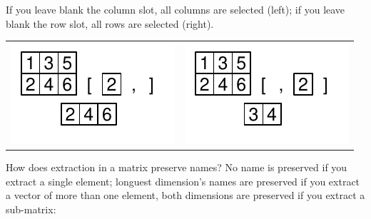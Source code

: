 \documentclass[pdflatex]{article}
\begin{document}
If you leave blank the column slot, all columns are selected (left); if you leave blank the row slot, all rows are selected (right).

\begin{tabular}{cc}
\includegraphics{matrix_extraction_rows} & \includegraphics{matrix_extraction_columns}\\
\end{tabular}

How does extraction in a matrix preserve names? No name is preserved if you extract a single element; longuest dimension's names are preserved if you extract a vector of more than one element, both dimensions are preserved if you extract a sub-matrix:
\end{document}
